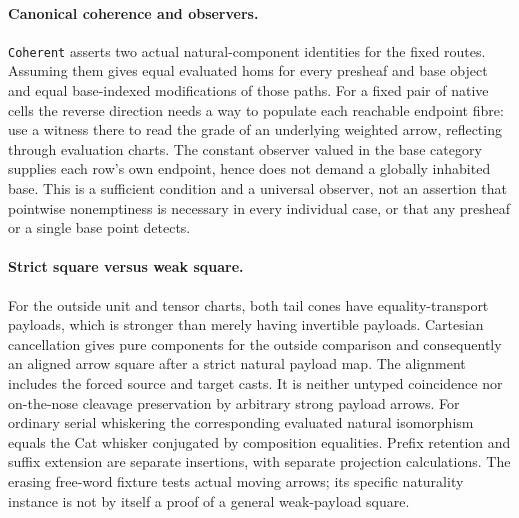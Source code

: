 \documentclass[11pt]{article}
\begin{document}
\paragraph{Canonical coherence and observers.}
\texttt{Coherent} asserts two actual natural-component identities for the
fixed routes. Assuming them gives equal evaluated homs for every presheaf
and base object and equal base-indexed modifications of those paths. For a
fixed pair of native cells the reverse direction needs a way to populate
each reachable endpoint fibre: use a witness there to read the grade
of an underlying weighted arrow, reflecting through evaluation charts.
The constant observer valued in the base category supplies each row's own
endpoint, hence does not demand a globally inhabited base. This is a
sufficient condition and a universal observer, not an assertion that
pointwise nonemptiness is necessary in every individual case, or that any
presheaf or a single base point detects.
\paragraph{Strict square versus weak square.}
For the outside unit and tensor charts, both tail cones have
equality-transport payloads, which is stronger than merely having
invertible payloads. Cartesian cancellation gives pure components for
the outside comparison and consequently an aligned arrow square after a
strict natural payload map. The alignment includes the forced source
and target casts. It is neither untyped coincidence nor on-the-nose
cleavage preservation by arbitrary strong payload arrows. For ordinary
serial whiskering the corresponding evaluated natural isomorphism equals
the Cat whisker conjugated by composition equalities. Prefix retention
and suffix extension are separate insertions, with separate projection
calculations. The erasing free-word fixture tests actual moving arrows;
its specific naturality instance is not by itself a proof of a general
weak-payload square.
\end{document}
